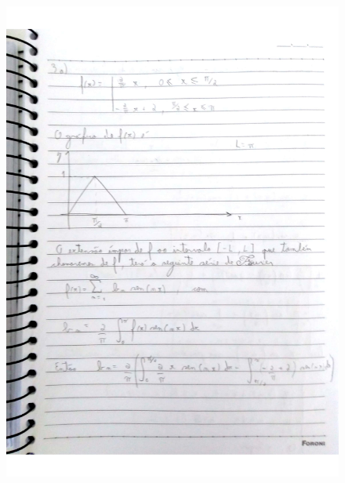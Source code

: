 \documentclass[a4paper]{article}
\begin{document}
    \section{} 
        \begin{figure}{\textwidth}
            \centering
            \includegraphics[width=\textwidth]{Questoes-1-3_page-0007.jpg}
        \end{figure}
\end{document}
